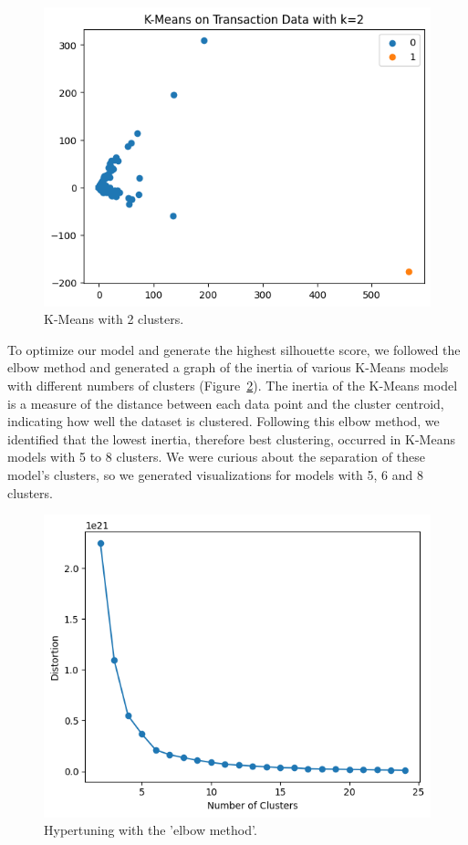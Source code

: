 \documentclass[sigconf]{acmart}
\begin{document}
\begin{figure}[H]
    \centering
    \includegraphics[width=0.8\linewidth]{M6-k-2.png}
    \caption{K-Means with 2 clusters.}
    \label{fig:k2Clusters}
\end{figure}

To optimize our model and generate the highest silhouette score, we followed the elbow method and generated a graph of the inertia of various K-Means models with different numbers of clusters (Figure~\ref{fig:ElbowMethod}). The inertia of the K-Means model is a measure of the distance between each data point and the cluster centroid, indicating how well the dataset is clustered. Following this elbow method, we identified that the lowest inertia, therefore best clustering, occurred in K-Means models with 5 to 8 clusters. We were curious about the separation of these model’s clusters, so we generated visualizations for models with 5, 6 and 8 clusters.

\begin{figure}[H]
    \centering
    \includegraphics[width=0.8\linewidth]{M6-elbow.png}
    \caption{Hypertuning with the 'elbow method'.}
    \label{fig:ElbowMethod}
\end{figure}
\end{document}
